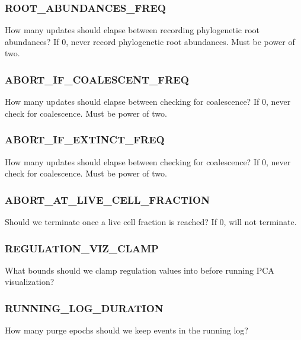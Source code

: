 \subsubsection{ROOT\_ABUNDANCES\_FREQ}


How many updates should elapse between recording phylogenetic root abundances?
If 0, never record phylogenetic root abundances.
Must be power of two.

\subsubsection{ABORT\_IF\_COALESCENT\_FREQ}


How many updates should elapse between checking for coalescence? If 0, never check for coalescence.
Must be power of two.

\subsubsection{ABORT\_IF\_EXTINCT\_FREQ}


How many updates should elapse between checking for coalescence? If 0, never check for coalescence. Must be power of two.

\subsubsection{ABORT\_AT\_LIVE\_CELL\_FRACTION}


Should we terminate once a live cell fraction is reached? If 0, will not terminate.

\subsubsection{REGULATION\_VIZ\_CLAMP}


What bounds should we clamp regulation values into before running PCA visualization?

\subsubsection{RUNNING\_LOG\_DURATION}


How many purge epochs should we keep events in the running log?

